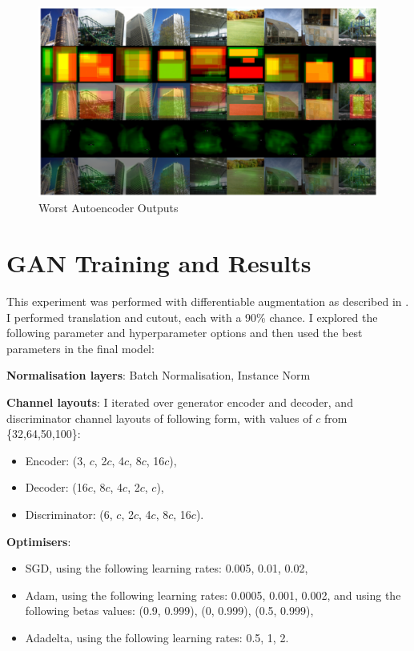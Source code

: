 \documentclass{UoYCSproject}
\begin{document}
\begin{figure}[h]
    \centering
    \includegraphics[width=\linewidth]{Worst autoencoder Outputs}
    \caption{Worst Autoencoder Outputs}
    \label{fig:autoencoderWorstOutput}
\end{figure}

\section{GAN Training and Results}

This experiment was performed with differentiable augmentation as described in \cite{zhao2020differentiable}. I performed translation and cutout, each with a 90\% chance. I explored the following parameter and hyperparameter options and then used the best parameters in the final model:

\textbf{Normalisation layers}: Batch Normalisation, Instance Norm

\textbf{Channel layouts}:
I iterated over generator encoder and decoder, and discriminator channel layouts of following form, with values of $c$ from \{32,64,50,100\}:
\begin{itemize}
\item Encoder: (3, $c$, 2$c$, 4$c$, 8$c$, 16$c$), 
\item Decoder: (16$c$, 8$c$, 4$c$, 2$c$, $c$),
\item Discriminator: (6, $c$, 2$c$, 4$c$, 8$c$, 16$c$).
\end{itemize}

\textbf{Optimisers}:
\begin{itemize}
\item SGD, using the following learning rates: 0.005, 0.01, 0.02,
\item Adam, using the following learning rates: 0.0005, 0.001, 0.002, and using the following betas values: (0.9, 0.999), (0, 0.999), (0.5, 0.999),
\item Adadelta, using the following learning rates: 0.5, 1, 2.
\end{itemize}
\end{document}
